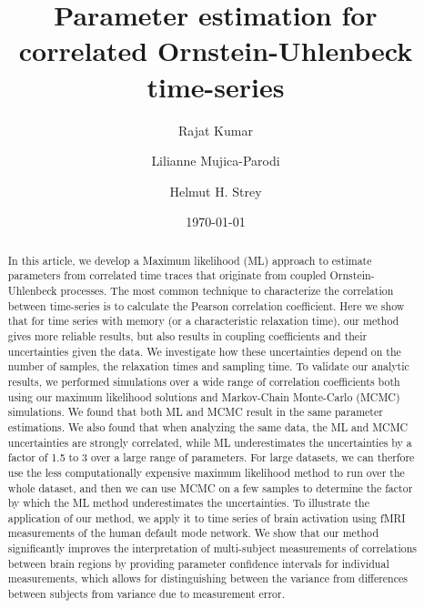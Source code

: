 \documentclass[%
 reprint,
 amsmath,amssymb,
 aps,
]{revtex4-1}
\begin{document}

\title{Parameter estimation for correlated Ornstein-Uhlenbeck time-series}

\author{Rajat Kumar}
\author{Lilianne Mujica-Parodi}
\author{Helmut H. Strey}

\date{\today}%

\begin{abstract}
In this article, we develop a Maximum likelihood (ML) approach to estimate parameters from correlated time traces that originate from coupled Ornstein-Uhlenbeck processes.  The most common technique to characterize the correlation between time-series is to calculate the Pearson correlation coefficient.  Here we show that for time series with memory (or a characteristic relaxation time), our method gives more reliable results, but also results in coupling coefficients and their uncertainties given the data.  We investigate how these uncertainties depend on the number of samples, the relaxation times and sampling time.  To validate our analytic results, we performed simulations over a wide range of correlation coefficients both using our maximum likelihood solutions and Markov-Chain Monte-Carlo (MCMC) simulations.  We found that both ML and MCMC result in the same parameter estimations.  We also found that when analyzing the same data, the ML and MCMC uncertainties are strongly correlated, while ML underestimates the uncertainties by a factor of 1.5 to 3 over a large range of parameters.  For large datasets, we can therfore use the less computationally expensive maximum likelihood method to run over the whole dataset, and then we can use MCMC on a few samples to determine the factor by which the ML method underestimates the uncertainties.  To illustrate the application of our method, we apply it to time series of brain activation using fMRI measurements of the human default mode network.  We show that our method significantly improves the interpretation of multi-subject measurements of correlations between brain regions by providing parameter confidence intervals for individual measurements, which allows for distinguishing between the variance from differences between subjects from variance due to measurement error.
\end{abstract}
\end{document}
